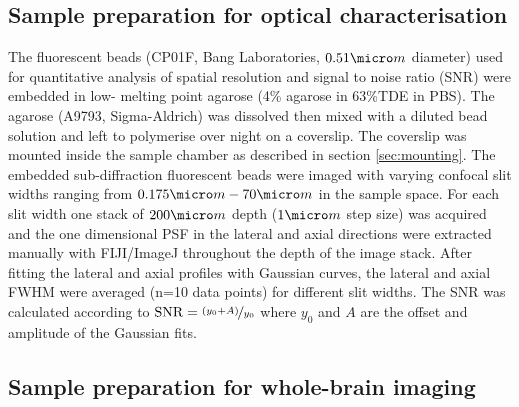 \documentclass[12pt]{spieman}  %
\begin{document}
\begin{spacing}{2}
\subsection{Sample preparation for optical characterisation}

The fluorescent beads (CP01F, Bang Laboratories, $0.51 \micro m$ diameter) used for quantitative analysis of spatial resolution and signal to noise ratio (SNR) were embedded in low- melting point agarose (4\% agarose in 63\%TDE in PBS). The agarose (A9793, Sigma-Aldrich) was dissolved then mixed with a diluted bead solution and left to polymerise over night on a coverslip. The coverslip was mounted inside the sample chamber as described in section \ref{sec:mounting}. The embedded sub-diffraction fluorescent beads were imaged with varying confocal slit widths ranging from $0.175 \micro m-70 \micro m$ in the sample space. For each slit width one stack of $200\micro m$ depth ($1 \micro m$ step size) was acquired and the one dimensional PSF in the lateral and axial directions were extracted manually with FIJI/ImageJ throughout the depth of the image stack. After fitting the lateral and axial profiles with Gaussian curves, the lateral and axial FWHM were averaged (n=10 data points) for different slit widths. The SNR was calculated according to $\text{SNR} = \nicefrac{(y_0 + A)}{y_0}$ where $y_0$ and $A$ are the offset and amplitude of the Gaussian fits.

\subsection{Sample preparation for whole-brain imaging}


\end{spacing}
\end{document}
